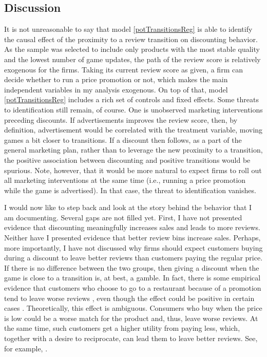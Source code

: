 \documentclass[12pt,pagebackref]{article}
\begin{document}
\hypertarget{discussion}{%
\subsection{Discussion}\label{discussion}}

It is not unreasonable to say that model \ref{potTransitionsReg} is able
to identify the causal effect of the proximity to a review transition on
discounting behavior. As the sample was selected to include only
products with the most stable quality and the lowest number of game
updates, the path of the review score is relatively exogenous for the
firms. Taking its current review score as given, a firm can decide
whether to run a price promotion or not, which makes the main
independent variables in my analysis exogenous. On top of that, model
\ref{potTransitionsReg} includes a rich set of controls and fixed
effects. Some threats to identification still remain, of course. One is
unobserved marketing interventions preceding discounts. If
advertisements improves the review score, then, by definition,
advertisement would be correlated with the treatment variable, moving
games a bit closer to transitions. If a discount then follows, as a part
of the general marketing plan, rather than to leverage the new proximity
to a transition, the positive association between discounting and
positive transitions would be spurious. Note, however, that it would be
more natural to expect firms to roll out all marketing interventions at
the same time (i.e., running a price promotion while the game is
advertised). In that case, the threat to identification vanishes.

I would now like to step back and look at the story behind the behavior
that I am documenting. Several gaps are not filled yet. First, I have
not presented evidence that discounting meaningfully increases sales and
leads to more reviews. Neither have I presented evidence that better
review bins increase sales. Perhaps, more importantly, I have not
discussed why firms should expect customers buying during a discount to
leave better reviews than customers paying the regular price. If there
is no difference between the two groups, then giving a discount when the
game is close to a transition is, at best, a gamble. In fact, there is
some empirical evidence that customers who choose to go to a restaurant
because of a promotion tend to leave worse reviews
\citep{ByersEtAl12, Li16}, even though the effect could be positive in
certain cases \citep{Li16, ZhuEtAl19}. Theoretically, this effect is
ambiguous. Consumers who buy when the price is low could be a worse
match for the product and, thus, leave worse reviews. At the same time,
such customers get a higher utility from paying less, which, together
with a desire to reciprocate, can lead them to leave better reviews.
See, for example, \citet{AcemogluEtAl19}.
\end{document}
